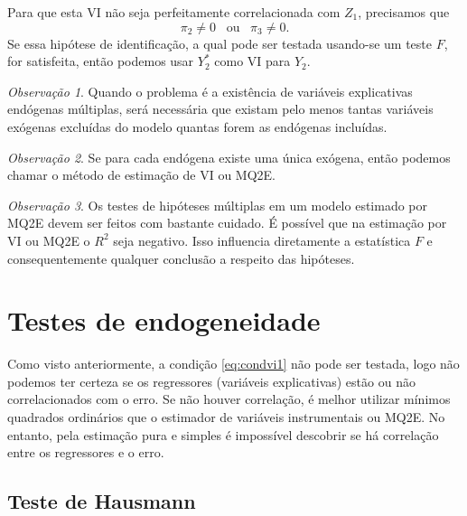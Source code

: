 \documentclass[
]{book}
\theoremstyle{definition}
\theoremstyle{definition}
\theoremstyle{definition}
\theoremstyle{remark}
\newtheorem*{remark}{Observação}
\begin{document}
Para que esta VI não seja perfeitamente correlacionada com \(Z_1\), precisamos que
\begin{equation}
\pi_2\neq 0\,\,\,\mbox{ ou }\,\,\,\pi_3\neq 0.
 \label{eq:pi1oupi2}
\end{equation}
Se essa hipótese de identificação, a qual pode ser testada usando-se um teste \(F\), for satisfeita, então podemos usar \(Y_2^*\) como VI para \(Y_2\).

\begin{remark}
{}Quando o problema é a existência de variáveis explicativas endógenas múltiplas, será necessária que existam pelo menos tantas variáveis exógenas excluídas do modelo quantas forem as endógenas incluídas.
\end{remark}

\begin{remark}
{}Se para cada endógena existe uma única exógena, então podemos chamar o método de estimação de VI ou MQ2E.
\end{remark}

\begin{remark}
{}Os testes de hipóteses múltiplas em um modelo estimado por MQ2E devem ser feitos com bastante cuidado. É possível que na estimação por VI ou MQ2E o \(R^2\) seja negativo. Isso influencia diretamente a estatística \(F\) e consequentemente qualquer conclusão a respeito das hipóteses.
\end{remark}

\hypertarget{testes-de-endogeneidade}{%
\section{Testes de endogeneidade}\label{testes-de-endogeneidade}}

Como visto anteriormente, a condição \eqref{eq:condvi1} não pode ser testada, logo não podemos ter certeza se os regressores (variáveis explicativas) estão ou não correlacionados com o erro. Se não houver correlação, é melhor utilizar mínimos quadrados ordinários que o estimador de variáveis instrumentais ou MQ2E. No entanto, pela estimação pura e simples é impossível descobrir se há correlação entre os regressores e o erro.

\hypertarget{teste-de-hausmann}{%
\subsection{Teste de Hausmann}\label{teste-de-hausmann}}
\end{document}
